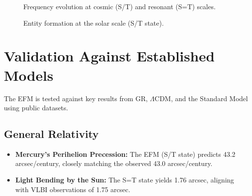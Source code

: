 \documentclass[11pt]{article}
\begin{document}
\begin{figure}[ht]
    \centering
    \caption{Frequency evolution at cosmic (S/T) and resonant (S=T) scales.}
    \label{fig:freq}
\end{figure}

\begin{figure}[ht]
    \centering
    \caption{Entity formation at the solar scale (S/T state).}
    \label{fig:entities}
\end{figure}

\section{Validation Against Established Models}
The EFM is tested against key results from GR, \(\Lambda\)CDM, and the Standard Model using public datasets.

\subsection{General Relativity}
\begin{itemize}
    \item \textbf{Mercury’s Perihelion Precession:} The EFM (S/T state) predicts 43.2 arcsec/century, closely matching the observed 43.0 arcsec/century.
    \item \textbf{Light Bending by the Sun:} The S=T state yields 1.76 arcsec, aligning with VLBI observations of 1.75 arcsec.
\end{itemize}
\end{document}
